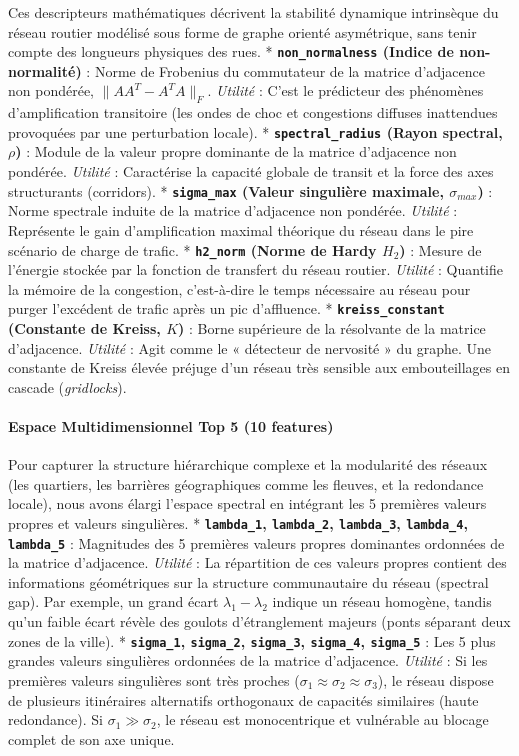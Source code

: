 \documentclass[10pt, a4paper]{article}
\begin{document}
Ces descripteurs mathématiques décrivent la stabilité dynamique
intrinsèque du réseau routier modélisé sous forme de graphe orienté
asymétrique, sans tenir compte des longueurs physiques des rues. *
\textbf{\texttt{non\_normalness} (Indice de non-normalité)} : Norme de
Frobenius du commutateur de la matrice d'adjacence non pondérée,
\(\|AA^T - A^TA\|_F\). \emph{Utilité} : C'est le prédicteur des
phénomènes d'amplification transitoire (les ondes de choc et congestions
diffuses inattendues provoquées par une perturbation locale). *
\textbf{\texttt{spectral\_radius} (Rayon spectral, \(\rho\))} : Module
de la valeur propre dominante de la matrice d'adjacence non pondérée.
\emph{Utilité} : Caractérise la capacité globale de transit et la force
des axes structurants (corridors). * \textbf{\texttt{sigma\_max} (Valeur
singulière maximale, \(\sigma_{max}\))} : Norme spectrale induite de la
matrice d'adjacence non pondérée. \emph{Utilité} : Représente le gain
d'amplification maximal théorique du réseau dans le pire scénario de
charge de trafic. * \textbf{\texttt{h2\_norm} (Norme de Hardy \(H_2\))}
: Mesure de l'énergie stockée par la fonction de transfert du réseau
routier. \emph{Utilité} : Quantifie la mémoire de la congestion,
c'est-à-dire le temps nécessaire au réseau pour purger l'excédent de
trafic après un pic d'affluence. * \textbf{\texttt{kreiss\_constant}
(Constante de Kreiss, \(K\))} : Borne supérieure de la résolvante de la
matrice d'adjacence. \emph{Utilité} : Agit comme le « détecteur de
nervosité » du graphe. Une constante de Kreiss élevée préjuge d'un
réseau très sensible aux embouteillages en cascade (\emph{gridlocks}).

\paragraph{Espace Multidimensionnel Top 5 (10
features)}\label{espace-multidimensionnel-top-5-10-features}

Pour capturer la structure hiérarchique complexe et la modularité des
réseaux (les quartiers, les barrières géographiques comme les fleuves,
et la redondance locale), nous avons élargi l'espace spectral en
intégrant les 5 premières valeurs propres et valeurs singulières. *
\textbf{\texttt{lambda\_1}, \texttt{lambda\_2}, \texttt{lambda\_3},
\texttt{lambda\_4}, \texttt{lambda\_5}} : Magnitudes des 5 premières
valeurs propres dominantes ordonnées de la matrice d'adjacence.
\emph{Utilité} : La répartition de ces valeurs propres contient des
informations géométriques sur la structure communautaire du réseau
(spectral gap). Par exemple, un grand écart \(\lambda_1 - \lambda_2\)
indique un réseau homogène, tandis qu'un faible écart révèle des goulots
d'étranglement majeurs (ponts séparant deux zones de la ville). *
\textbf{\texttt{sigma\_1}, \texttt{sigma\_2}, \texttt{sigma\_3},
\texttt{sigma\_4}, \texttt{sigma\_5}} : Les 5 plus grandes valeurs
singulières ordonnées de la matrice d'adjacence. \emph{Utilité} : Si les
premières valeurs singulières sont très proches
(\(\sigma_1 \approx \sigma_2 \approx \sigma_3\)), le réseau dispose de
plusieurs itinéraires alternatifs orthogonaux de capacités similaires
(haute redondance). Si \(\sigma_1 \gg \sigma_2\), le réseau est
monocentrique et vulnérable au blocage complet de son axe unique.
\end{document}
